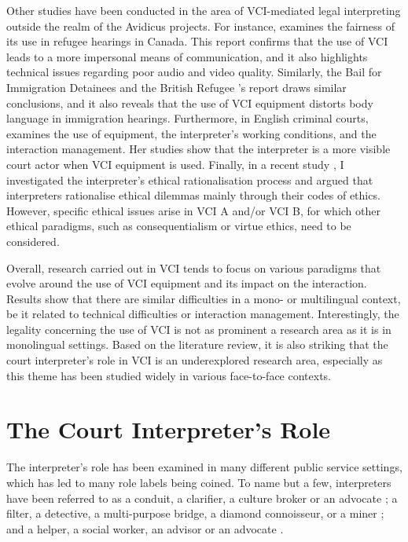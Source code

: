 \documentclass[output=paper]{langsci/langscibook}
\begin{document}
Other studies have been conducted in the area of \textsc{VCI}-mediated legal interpreting outside the realm of the Avidicus projects. For instance, \citet{Ellis2004} examines the fairness of its use in refugee hearings in Canada. This report confirms that the use of \textsc{VCI} leads to a more impersonal means of communication, and it also highlights technical issues regarding poor audio and video quality. Similarly, the Bail for Immigration Detainees and the British Refugee \citet{Bail2008}’s report draws similar conclusions, and it also reveals that the use of \textsc{VCI} equipment distorts body language in immigration hearings. Furthermore, in English criminal courts, \citet{Fowler2012} examines the use of equipment, the interpreter’s working conditions, and the interaction management. Her studies show that the interpreter is a more visible court actor when \textsc{VCI} equipment is used. Finally, in a recent study \citet{Devaux2017a}, I investigated the interpreter’s ethical rationalisation process and argued that interpreters rationalise ethical dilemmas mainly through their codes of ethics. However, specific ethical issues arise in \textsc{VCI} A and/or \textsc{VCI} B, for which other ethical paradigms, such as consequentialism or virtue ethics, need to be considered. 

Overall, research carried out in \textsc{VCI} tends to focus on various paradigms that evolve around the use of \textsc{VCI} equipment and its impact on the interaction. Results show that there are similar difficulties in a mono- or multilingual context, be it related to technical difficulties or interaction management. Interestingly, the legality concerning the use of \textsc{VCI} is not as prominent a research area as it is in monolingual settings. Based on the literature review, it is also striking that the court interpreter’s role in \textsc{VCI} is an underexplored research area, especially as this theme has been studied widely in various face-to-face contexts. 

\section{The Court Interpreter’s Role}
The interpreter’s role has been examined in many different public service settings, which has led to many role labels being coined. To name but a few, interpreters have been referred to as a conduit, a clarifier, a culture broker or an advocate \citep{Niska2002}; a filter, a detective, a multi-purpose bridge, a diamond connoisseur, or a miner \citep{Angelelli2004}; and a helper, a social worker, an advisor or an advocate \citep{Grbic2011}.
\end{document}
